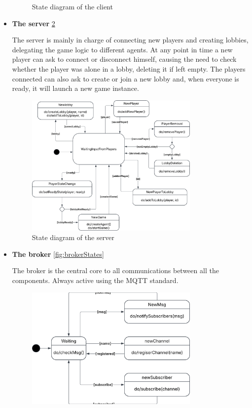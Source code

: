 \documentclass{scrartcl}
\begin{document}
\begin{itemize}
\begin{figure}[H]
              \caption{State diagram of the client}
              \label{fig:clientStates}
          \end{figure}
    \item
          \textbf{The server} \cref{fig:serverStates} \par
          The server is mainly in charge of connecting new players and creating lobbies,
          delegating the game logic to different agents. \newline
          At any point in time a new player can ask to connect or disconnect himself, causing the need to
          check whether the player was alone in a lobby, deleting it if left empty. The players connected
          can also ask to create or join a new lobby and, when everyone is ready,
          it will launch a new game instance.
          \begin{figure}[H]
              \centering
              \includegraphics[width=0.8\textwidth]{figures/serverStates.png}
              \caption{State diagram of the server}
              \label{fig:serverStates}
          \end{figure}
    \item
          \textbf{The broker} \cref{fig:brokerStates} \par
          The broker is the central core to all communications between all the components.
          Always active using the MQTT standard.
          \begin{figure}[H]
              \centering
              \includegraphics[width=0.8\textwidth]{figures/brokerStates.png}

\end{figure}
\end{itemize}
\end{document}
